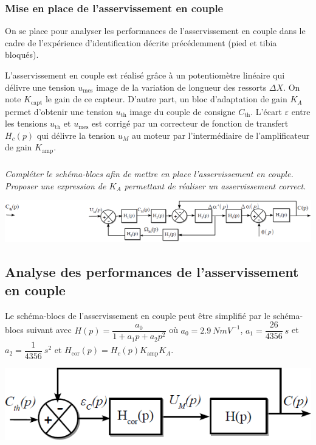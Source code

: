 \documentclass[10pt,fleqn]{article} %
\begin{document}
\begin{multicols}{2}
\subsubsection*{Mise en place de l'asservissement en couple}
On se place pour analyser les performances de l'asservissement en couple dans le cadre de l'expérience
d'identification décrite précédemment (pied et tibia bloqués).

L'asservissement en couple est réalisé grâce à un potentiomètre linéaire qui délivre une tension $u_{\text{mes}}$ image de la
variation de longueur des ressorts $\Delta X $. On note $K_{\text{capt}}$ le gain de ce capteur. D'autre part, un bloc d'adaptation de gain $K_A$ permet d'obtenir une tension $u_{\text{th}}$ image du couple de consigne $C_{\text{th}}$. L'écart $\varepsilon$ entre les tensions $u_{\text{th}}$ et
$u_{\text{mes}}$ est corrigé par un correcteur de fonction de transfert $H_c ( p)$ qui délivre la tension $u_M$ au moteur par
l'intermédiaire de l'amplificateur de gain $K_{\text{amp}}$.



\subparagraph{}
\textit{Compléter le schéma-blocs afin de mettre en place
l'asservissement en couple. Proposer une expression de $K_A$ permettant de réaliser un asservissement
correct.}
\ifprof
\begin{corrige}
\end{corrige}
\else
\fi

\begin{center}
\includegraphics[width=\linewidth]{images/ccmp_09}

\end{center}

\subsection*{Analyse des performances de l'asservissement en couple}

Le schéma-blocs de l'asservissement en couple peut être simplifié par le schéma-blocs suivant avec 
$H( p)=\dfrac{a_0}{1+a_1 p+a_2 p^2}$ où 
$a_0=\SI{2,9}{NmV^{-1}}$, 
$a_1=\dfrac{26}{4356}\SI{}{s}$ et $a_2=\dfrac{1}{4356}\SI{}{s^2}$ et $H_{\text{cor}}( p)=H_c (p)K_{\text{amp}}K_A$.
\begin{center}
\includegraphics[width=\linewidth]{images/ccmp_04}


\end{center}
\end{multicols}
\end{document}
